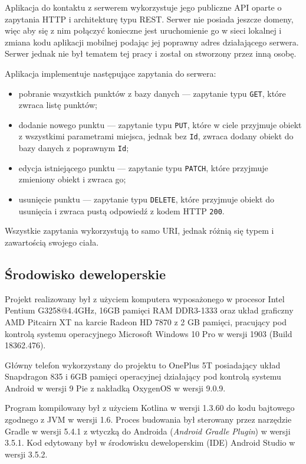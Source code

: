 \documentclass[polish,polish,a4paper,12pt]{article}
\begin{document}
	Aplikacja do kontaktu z serwerem wykorzystuje jego publiczne API oparte o zapytania HTTP i architekturę typu REST. Serwer nie posiada jeszcze domeny, więc aby się z nim połączyć konieczne jest uruchomienie go w sieci lokalnej i zmiana kodu aplikacji mobilnej podając jej poprawny adres działającego serwera. Serwer jednak nie był tematem tej pracy i został on stworzony przez inną osobę.

	Aplikacja implementuje następujące zapytania do serwera:

	\begin{itemize}
		\item pobranie wszystkich punktów z bazy danych — zapytanie typu \texttt{GET}, które zwraca listę punktów;
		\item dodanie nowego punktu — zapytanie typu \texttt{PUT}, które w ciele przyjmuje obiekt z wszystkimi parametrami miejsca, jednak bez \texttt{Id}, zwraca dodany obiekt do bazy danych z poprawnym \texttt{Id};
		\item edycja istniejącego punktu — zapytanie typu \texttt{PATCH}, które przyjmuje zmieniony obiekt i zwraca go;
		\item usunięcie punktu — zapytanie typu \texttt{DELETE}, które przyjmuje obiekt do usunięcia i zwraca pustą odpowiedź z kodem HTTP \texttt{200}.
	\end{itemize}

	Wszystkie zapytania wykorzystują to samo URI, jednak różnią się typem i zawartością swojego ciała.

	\subsection{Środowisko deweloperskie}

	Projekt realizowany był z użyciem komputera wyposażonego w procesor Intel Pentium G3258@4.4GHz, 16GB pamięci RAM DDR3-1333 oraz układ graficzny AMD Pitcairn XT na karcie Radeon HD 7870 z 2 GB pamięci, pracujący pod kontrolą systemu operacyjnego Microsoft Windows 10 Pro w wersji 1903 (Build 18362.476).

	Główny telefon wykorzystany do projektu to OnePlus 5T posiadający układ Snapdragon 835 i 6GB pamięci operacyjnej działający pod kontrolą systemu Android w wersji 9 Pie z nakładką OxygenOS w wersji 9.0.9.

	Program kompilowany był z użyciem Kotlina w wersji 1.3.60 do kodu bajtowego zgodnego z JVM w wersji 1.6. Proces budowania był sterowany przez narzędzie Gradle w wersji 5.4.1 z wtyczką do Androida (\textit{Android Gradle Plugin}) w wersji 3.5.1. Kod edytowany był w środowisku deweloperskim (IDE) Android Studio w wersji 3.5.2.
\end{document}
